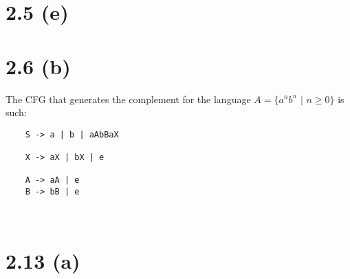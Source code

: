 \documentclass{article}
\begin{document}
\section*{2.5 (e)}

\newpage
\section*{2.6 (b)}
The CFG that generates the complement for the language $A = \{a^nb^n$ $\mid$ $n \geq 0\}$ is such:
    
\begin{center}
    
    \begin{lstlisting}
    S -> a | b | aAbBaX
    
    X -> aX | bX | e
    
    A -> aA | e
    B -> bB | e
    
    
    \end{lstlisting}
    
\end{center}

\section*{2.13 (a)}
\end{document}
